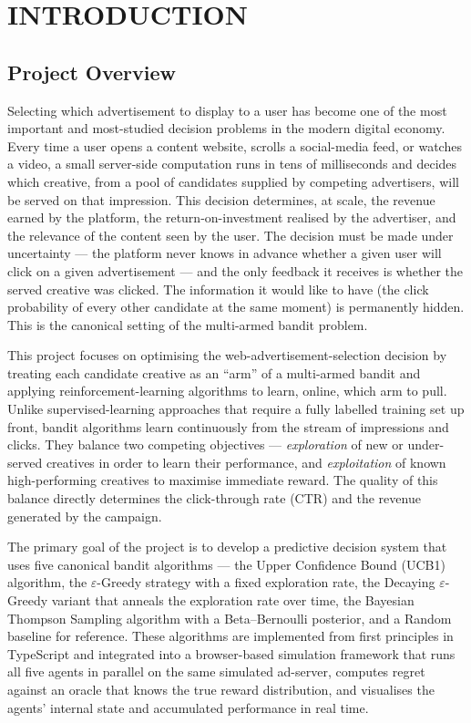 \section{INTRODUCTION}

\subsection{Project Overview}
Selecting which advertisement to display to a user has become one of the most important and most-studied decision problems in the modern digital economy. Every time a user opens a content website, scrolls a social-media feed, or watches a video, a small server-side computation runs in tens of milliseconds and decides which creative, from a pool of candidates supplied by competing advertisers, will be served on that impression. This decision determines, at scale, the revenue earned by the platform, the return-on-investment realised by the advertiser, and the relevance of the content seen by the user. The decision must be made under uncertainty --- the platform never knows in advance whether a given user will click on a given advertisement --- and the only feedback it receives is whether the served creative was clicked. The information it would like to have (the click probability of every other candidate at the same moment) is permanently hidden. This is the canonical setting of the multi-armed bandit problem.

This project focuses on optimising the web-advertisement-selection decision by treating each candidate creative as an ``arm'' of a multi-armed bandit and applying reinforcement-learning algorithms to learn, online, which arm to pull. Unlike supervised-learning approaches that require a fully labelled training set up front, bandit algorithms learn continuously from the stream of impressions and clicks. They balance two competing objectives --- \emph{exploration} of new or under-served creatives in order to learn their performance, and \emph{exploitation} of known high-performing creatives to maximise immediate reward. The quality of this balance directly determines the click-through rate (CTR) and the revenue generated by the campaign.

The primary goal of the project is to develop a predictive decision system that uses five canonical bandit algorithms --- the Upper Confidence Bound (UCB1) algorithm, the $\varepsilon$-Greedy strategy with a fixed exploration rate, the Decaying $\varepsilon$-Greedy variant that anneals the exploration rate over time, the Bayesian Thompson Sampling algorithm with a Beta--Bernoulli posterior, and a Random baseline for reference. These algorithms are implemented from first principles in TypeScript and integrated into a browser-based simulation framework that runs all five agents in parallel on the same simulated ad-server, computes regret against an oracle that knows the true reward distribution, and visualises the agents' internal state and accumulated performance in real time.

